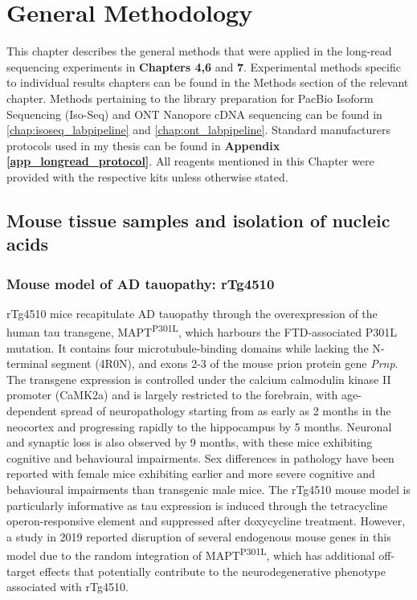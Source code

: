 \chapter{General Methodology}\label{ch: general methodology}

This chapter describes the general methods that were applied in the long-read sequencing experiments in \textbf{Chapters 4,6} and \textbf{7}. Experimental methods specific to individual results chapters can be found in the Methods section of the relevant chapter. Methods pertaining to the library preparation for PacBio Isoform Sequencing (Iso-Seq) and ONT Nanopore cDNA sequencing can be found in \cref{chap:isoseq_labpipeline} and \cref{chap:ont_labpipeline}. Standard manufacturers protocols used in my thesis can be found in \textbf{Appendix \ref{app_longread_protocol}}. All reagents mentioned in this Chapter were provided with the respective kits unless otherwise stated.

\section{Mouse tissue samples and isolation of nucleic acids}

\subsection{Mouse model of AD tauopathy: rTg4510} 
rTg4510 mice recapitulate AD tauopathy through the overexpression of the human tau transgene, MAPT\textsuperscript{P301L}, which harbours the FTD-associated P301L mutation. It contains four microtubule-binding domains while lacking the N-terminal segment (4R0N), and exons 2-3 of the mouse prion protein gene \textit{Prnp}. The transgene expression is controlled under the calcium calmodulin kinase II promoter (CaMK2a) and is largely restricted to the forebrain, with age-dependent spread of neuropathology starting from as early as 2 months in the neocortex and progressing rapidly to the hippocampus by 5 months. Neuronal and synaptic loss is also observed by 9 months, with these mice exhibiting cognitive and behavioural impairments. Sex differences in pathology have been reported with female mice exhibiting earlier and more severe cognitive and behavioural impairments than transgenic male mice\cite{M2011}. The rTg4510 mouse model is particularly informative as tau expression is induced through the tetracycline operon-responsive element and suppressed after doxycycline treatment\cite{Ramsden2005}. However, a study in 2019 reported disruption of several endogenous mouse genes in this model due to the random integration of MAPT\textsuperscript{P301L}, which has additional off-target effects that potentially contribute to the neurodegenerative phenotype associated with rTg4510\cite{Gamache2019}. 
 

